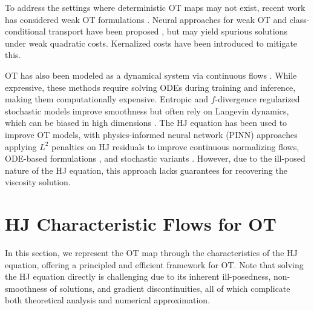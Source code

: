 \documentclass{article} %
\theoremstyle{plain}
\theoremstyle{definition}
\theoremstyle{remark}
\begin{document}
To address the settings where deterministic OT maps may not exist, recent work has considered weak OT formulations \citep{backhoff2019existence}. Neural approaches for weak OT and class-conditional transport have been proposed \citep{korotin2022neural, asadulaev2022neural}, but may yield spurious solutions under weak quadratic costs. Kernalized costs \citep{korotin2022kernel} have been introduced to mitigate this.

OT has also been modeled as a dynamical system via continuous flows \citep{yang2020potential, tong2020trajectorynet, onken2021ot, huguet2022manifold}. While expressive, these methods require solving ODEs during training and inference, making them computationally expensive. Entropic and $f$-divergence regularized stochastic models \citep{daniels2021score, gushchin2023entropic} improve smoothness but often rely on Langevin dynamics, which can be biased in high dimensions \citep{korotin2019wasserstein}. The HJ equation has been used to improve OT models, with physics-informed neural network (PINN) \citep{raissi2019physics} approaches applying $L^2$ penalties on HJ residuals to improve continuous normalizing flows, ODE-based formulations \citep{yang2020potential, onken2021ot}, and stochastic variants \citep{zhang2023mean}. However, due to the ill-posed nature of the HJ equation, this approach lacks guarantees for recovering the viscosity solution.

\section{HJ Characteristic Flows for OT}\vspace{-0.2em}
In this section, we represent the OT map through the characteristics of the HJ equation, offering a principled and efficient framework for OT. Note that solving the HJ equation directly is challenging due to its inherent ill-posedness, non-smoothness of solutions, and gradient discontinuities, all of which complicate both theoretical analysis and numerical approximation.
\end{document}
